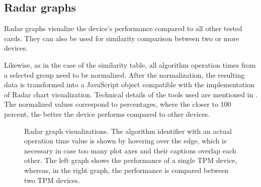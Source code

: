 \subsection{Radar graphs}
Radar graphs visualize the device's performance compared to all other tested cards. They can also be used for similarity comparison between two or more devices.

Likewise, as in the case of the similarity table, all algorithm operation times from a selected group need to be normalized. After the normalization, the resulting data is transformed into a JavaScript object compatible with the implementation of Radar chart visualization. Technical details of the tools used are mentioned in . The normalized values correspond to percentages, where the closer to 100 percent, the better the device performs compared to other devices. 

\begin{figure}[H]
  \centering
  \hfill
  \caption{Radar graph visualizations. The algorithm identifier with an actual operation time value is shown by hovering over the edge, which is necessary in case too many plot axes and their captions overlap each other. The left graph shows the performance of a single TPM device, whereas, in the right graph, the performance is compared between two TPM devices. }
\end{figure}


